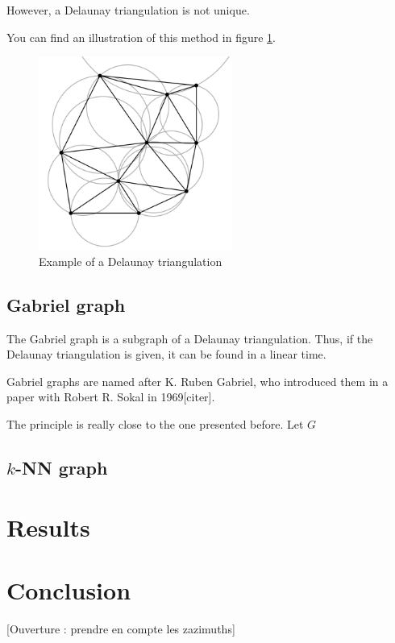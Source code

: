\documentclass[lettersize,journal]{IEEEtran}
\begin{document}
However, a Delaunay triangulation is not unique.

You can find an illustration of this method in figure \ref{del_tri}.
\begin{figure}[!t]
    \centering
    \includegraphics[width=2.5in]{images/illus_graphs/Delaunay_circumcircles_vectorial.svg.png}
    \caption{Example of a Delaunay triangulation}
    \label{del_tri}
\end{figure}

\subsection{Gabriel graph}
\noindent The Gabriel graph is a subgraph of a Delaunay triangulation. Thus, if the Delaunay triangulation is given, it can be found in a linear time. 

Gabriel graphs are named after K. Ruben Gabriel, who introduced them in a paper with Robert R. Sokal in 1969[citer].

The principle is really close to the one presented before. Let $G$

\subsection{$k$-NN graph}

\section{Results}

\section{Conclusion}

[Ouverture : prendre en compte les zazimuths]

\printglossary[type=\acronymtype]



\end{document}
